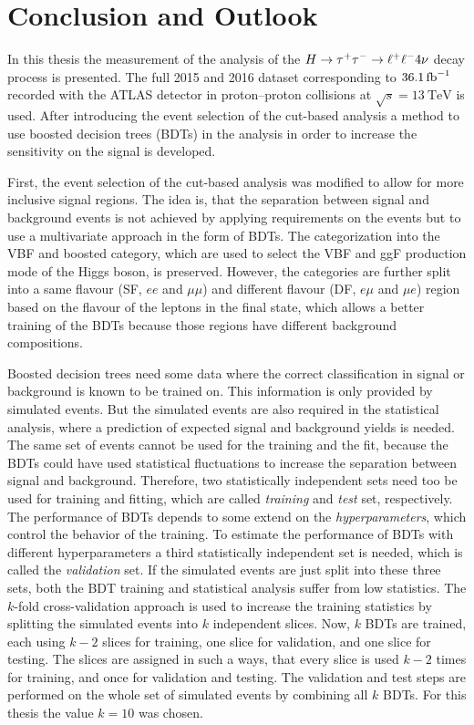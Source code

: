 \chapter{Conclusion and Outlook}\label{cha:conclusion}

In this thesis the measurement of the analysis of the $H \to \tau^+\tau^- \to \ell^+\ell^- 4\nu$ decay process is presented.
The full 2015 and 2016 dataset corresponding to $\SI{36.1}{\invfb}$ recorded with the ATLAS detector
in proton--proton collisions at $\sqrt{s} = \SI{13}{\TeV}$ is used.
After introducing the event selection of the cut-based analysis
a method to use boosted decision trees (BDTs) in the analysis in order to increase the sensitivity on the signal
is developed.

First, the event selection of the cut-based analysis was modified to allow for more inclusive signal regions.
The idea is, that the separation between signal and background events is not achieved by applying requirements on the
events but to use a multivariate approach in the form of BDTs.
The categorization into the VBF and boosted category, which are used to select the VBF and ggF production mode
of the Higgs boson, is preserved.
However, the categories are further split into a same flavour (SF, $ee$ and $\mu\mu$) and different flavour (DF, $e\mu$ and $\mu e$)
region based on the flavour of the leptons in the final state,
which allows a better training of the BDTs because those regions have different background compositions.

Boosted decision trees need some data where the correct classification in signal or background is known to be trained on.
This information is only provided by simulated events.
But the simulated events are also required in the statistical analysis, where a prediction of expected signal and background
yields is needed.
The same set of events cannot be used for the training and the fit, because the BDTs could have used statistical fluctuations
to increase the separation between signal and background.
Therefore, two statistically independent sets need too be used for training and fitting, which are called \emph{training} and \emph{test} set, respectively.
The performance of BDTs depends to some extend on the \emph{hyperparameters}, which control the behavior of the training.
To estimate the performance of BDTs with different hyperparameters a third statistically independent set is needed, which is called the \emph{validation}
set.
If the simulated events are just split into these three sets, both the BDT training and statistical analysis suffer from
low statistics.
The $k$-fold cross-validation approach is used to increase the training statistics by splitting the simulated events
into $k$ independent slices.
Now, $k$ BDTs are trained, each using $k-2$ slices for training, one slice for validation, and one slice for testing.
The slices are assigned in such a ways, that every slice is used $k-2$ times for training, and once for validation and testing.
The validation and test steps are performed on the whole set of simulated events by combining all $k$ BDTs.
For this thesis the value $k=10$ was chosen.

